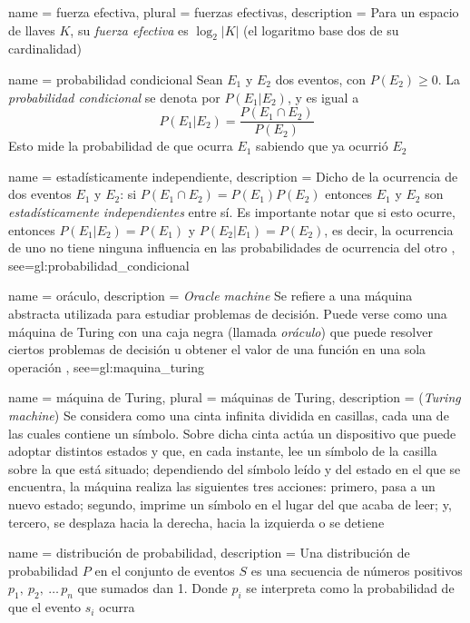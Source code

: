 {
  name = fuerza efectiva,
  plural = fuerzas efectivas,
  description = {
    Para un espacio de llaves $ K $, su \textit{fuerza efectiva} es
    $ \log_2 | K | $ (el logaritmo base dos de su cardinalidad)%
  }
}

{
  name = probabilidad condicional
}
{%
  Sean $ E_1 $ y $ E_2 $ dos eventos, con $ P(E_2) \ge 0 $. La
  \textit{probabilidad condicional} se denota por $ P(E_1 | E_2) $, y es
  igual a
  $$ P(E_1 | E_2) = \frac{P(E_1 \cap E_2)}{P(E_2)} $$
  Esto mide la probabilidad de que ocurra $ E_1 $ sabiendo que ya ocurrió
  $ E_2 $%
}

{
  name = estadísticamente independiente,
  description = {
    Dicho de la ocurrencia de dos eventos $ E_1 $ y $ E_2 $: si
    $ P(E_1 \cap E_2) = P(E_1) P(E_2) $ entonces $ E_1 $ y $ E_2 $ son
    \textit{estadísticamente independientes} entre sí. Es importante notar
    que si esto ocurre, entonces $ P(E_1 | E_2) = P(E_1) $ y
    $ P(E_2 | E_1) = P(E_2) $, es decir, la ocurrencia de uno no tiene ninguna
    influencia en las probabilidades de ocurrencia del otro%
  },
  see={gl:probabilidad_condicional}
}

{
  name = oráculo,
  description = {
    \textit{Oracle machine} Se refiere a una máquina abstracta utilizada para
    estudiar problemas de decisión. Puede verse como una máquina de Turing con
    una caja negra (llamada \textit{oráculo}) que puede resolver ciertos
    problemas de decisión u obtener el valor de una función en una sola
    operación%
  },
  see={gl:maquina_turing}
}

{
  name = máquina de Turing,
  plural = máquinas de Turing,
  description = {
    (\textit{Turing machine}) Se considera como una cinta infinita dividida
    en casillas, cada una de las cuales contiene un símbolo. Sobre dicha cinta
    actúa un dispositivo que puede adoptar distintos estados y que, en cada
    instante, lee un símbolo de la casilla sobre la que está situado;
    dependiendo del símbolo leído y del estado en el que se encuentra, la
    máquina realiza las siguientes tres acciones: primero, pasa a un nuevo
    estado; segundo, imprime un símbolo en el lugar del que acaba de leer;
    y, tercero, se desplaza hacia la derecha, hacia la izquierda o se detiene%
  }
}

{
  name = distribución de probabilidad,
  description = {
    Una distribución de probabilidad $P$ en el conjunto de eventos $S$ es
    una secuencia de números positivos $p_1,\: p_2,\: \dots\, p_n$ que
    sumados dan 1. Donde $p_i$ se interpreta como la probabilidad de
    que el evento $s_i$ ocurra%
  }
}

